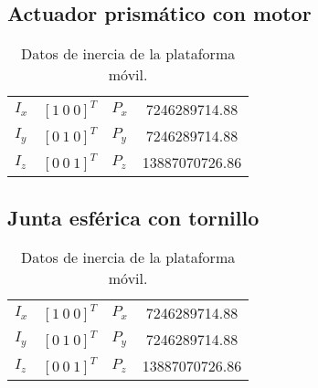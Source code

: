 \subsection{Actuador prismático con motor}
\begin{table}[hb!]
 \begin{center}
\begin{tabular}{lclc}
 $ I_x $ & $ [1 \ 0 \ 0]^T $ & $ P_x $ & 7246289714.88\\
 $ I_y $ & $ [0 \ 1 \ 0]^T $ & $ P_y $ & 7246289714.88\\
 $ I_z $ & $ [0 \ 0 \ 1]^T $ & $ P_z $ & 13887070726.86
\end{tabular}
\end{center}
\caption{Datos de inercia de la plataforma móvil.}
\end{table}

\subsection{Junta esférica con tornillo}
\begin{table}[hb!]
 \begin{center}
\begin{tabular}{lclc}
 $ I_x $ & $ [1 \ 0 \ 0]^T $ & $ P_x $ & 7246289714.88\\
 $ I_y $ & $ [0 \ 1 \ 0]^T $ & $ P_y $ & 7246289714.88\\
 $ I_z $ & $ [0 \ 0 \ 1]^T $ & $ P_z $ & 13887070726.86
\end{tabular}
\end{center}
\caption{Datos de inercia de la plataforma móvil.}
\end{table}
